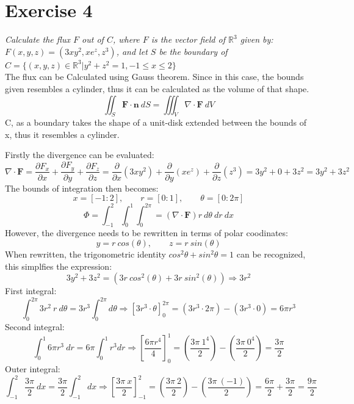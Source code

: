 \section{Exercise 4}
\textit{Calculate the flux $F$ out of $C$, where $F$ is the vector field of $\mathbb{R}^3$ given 
by: $F(x,y,z) = (3xy^2, xe^z, z^3)$, and let $S$ be the boundary of
$C = \{(x,y,z) \in \mathbb{R}^3 | y^2 + z^2 = 1, -1 \le x \le 2\}$}\\

The flux can be Calculated using Gauss theorem. Since in this case, the bounds given
resembles a cylinder, thus it can be calculated as the volume of that shape.
\[\iint_S \mathbf{F} \cdot \mathbf{n} \ dS = \iiint_V \nabla \cdot \mathbf{F} \ dV\]
C, as a boundary takes the shape of a unit-disk extended between the bounds of x, thus
it resembles a cylinder.

Firstly the divergence can be evaluated:
\[\nabla \cdot \mathbf{F} = 
\frac{\partial F_x}{\partial  x} +
\frac{\partial F_y}{\partial  y} +
\frac{\partial F_z}{\partial  z} 
= 
\frac{\partial}{\partial x}(3xy^2)+
\frac{\partial}{\partial y}(xe^z)+
\frac{\partial}{\partial z}(z^3)
=
3y^2 + 0 +3z^2 = 3y^2 + 3z^2\]
The bounds of integration then becomes:
\[x = [-1:2], \qquad r=[0:1], \qquad \theta = [0:2\pi]\]
\[\Phi = \int_{-1}^{2}\int_{0}^{1}\int_{0}^{2\pi} = (\nabla \cdot \mathbf{F}) r \ d\theta \ dr \ dx \]
However, the divergence needs to be rewritten in terms of polar coodinates:
\[y = r \ cos(\theta),\qquad z = r \ sin(\theta)\]
When rewritten, the trigonometric identity $cos^2\theta + sin^2\theta = 1$ can be recognized,
this simplfies the expression:
\[3y^2 + 3z^2 = (3r \ cos^2(\theta)+ 3r \ sin^2(\theta)) \Rightarrow 3r^2\]
First integral:
\[\int_{0}^{2\pi} 3r^2 \ r \ d\theta = 3r^3\int_{0}^{2\pi}d\theta \Rightarrow \left[3r^3\cdot \theta\right]_0^{2\pi} = \left(3r^3\cdot 2\pi\right) - (3r^3\cdot 0) = 6\pi r^3\]
Second integral:
\[\int_{0}^{1} 6\pi r^3 \ dr = 6\pi \int_{0}^{1} r^3 dr \Rightarrow 
\left[\frac{6\pi r^4}{4}\right]_0^1 = \left(\frac{3\pi \ 1^4}{2}\right) - \left(\frac{3\pi \ 0^4}{2}\right)
=  \frac{3\pi}{2}\]
Outer integral:
\[\int_{-1}^{2} \frac{3\pi}{2} \ dx = \frac{3\pi}{2}\int_{-1}^{2}dx 
\Rightarrow \left[\frac{3\pi \ x}{2}\right]_{-1}^{2} = 
\left(\frac{3\pi \ 2}{2}\right) - \left(\frac{3\pi \ (-1)}{2}\right) = \frac{6\pi}{2} + \frac{3\pi}{2} = \frac{9\pi}{2} \]
\[\]
\[\]
